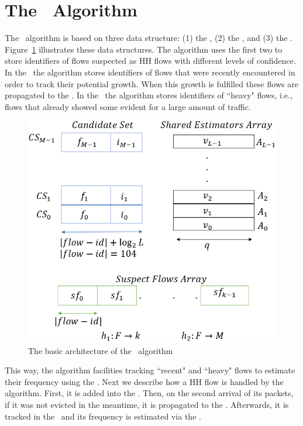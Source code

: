 \section{The \cs\ Algorithm}
\label{sec:architecture}
The \cs\ algorithm is based on three data structure: (1) the \textit{\sfa}, (2) the \textit{\cs}, and (3) the \textit{\sea}. Figure~\ref{fig:ds} illustrates these data structures.
The algorithm uses the first two to store identifiers of flows suspected as HH flows with different levels of confidence.
In the \sfa\ the algorithm stores identifiers of flows that were recently encountered in order to track their potential growth.  When this growth is fulfilled these flows are propagated to the \cs. In the \cs\ the algorithm stores identifiers of ``heavy" flows, i.e., flows that already showed some evident for a large amount of traffic.

\begin{figure}
    \centering
    \includegraphics[width=\linewidth]{HH/figures/ds.png}
    \caption{The basic architecture of the \cs\ algorithm}
    \label{fig:ds}
\end{figure}

This way, the algorithm facilities tracking ``recent" and ``heavy" flows to estimate their frequency using the \sea. Next we describe  how a HH flow is handled by the algorithm. First, it is added into the \sfa. Then, on the second arrival of its packets, if it was not evicted in the meantime, it is propagated to the \cs. Afterwards, it is tracked in the \cs\ and its frequency is estimated via the \sea.

